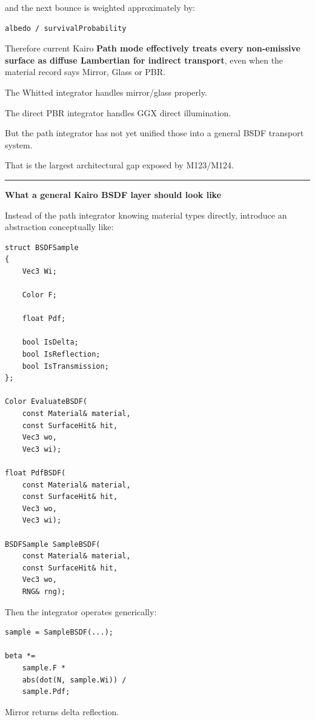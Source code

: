 and the next bounce is weighted approximately by:

\begin{verbatim}
albedo / survivalProbability
\end{verbatim}

Therefore current Kairo \textbf{Path mode effectively treats every non-emissive surface as diffuse Lambertian for indirect transport}, even when the material record says Mirror, Glass or PBR.

The Whitted integrator handles mirror/glass properly.

The direct PBR integrator handles GGX direct illumination.

But the path integrator has not yet unified those into a general BSDF transport system.

That is the largest architectural gap exposed by M123/M124.

\begin{center}\rule{0.5\linewidth}{0.5pt}\end{center}

\textbf{What a general Kairo BSDF layer should look like}

Instead of the path integrator knowing material types directly, introduce an abstraction conceptually like:

\begin{verbatim}
struct BSDFSample
{
    Vec3 Wi;

    Color F;

    float Pdf;

    bool IsDelta;
    bool IsReflection;
    bool IsTransmission;
};

Color EvaluateBSDF(
    const Material& material,
    const SurfaceHit& hit,
    Vec3 wo,
    Vec3 wi);

float PdfBSDF(
    const Material& material,
    const SurfaceHit& hit,
    Vec3 wo,
    Vec3 wi);

BSDFSample SampleBSDF(
    const Material& material,
    const SurfaceHit& hit,
    Vec3 wo,
    RNG& rng);
\end{verbatim}

Then the integrator operates generically:

\begin{verbatim}
sample = SampleBSDF(...);

beta *=
    sample.F *
    abs(dot(N, sample.Wi)) /
    sample.Pdf;
\end{verbatim}

Mirror returns delta reflection.


